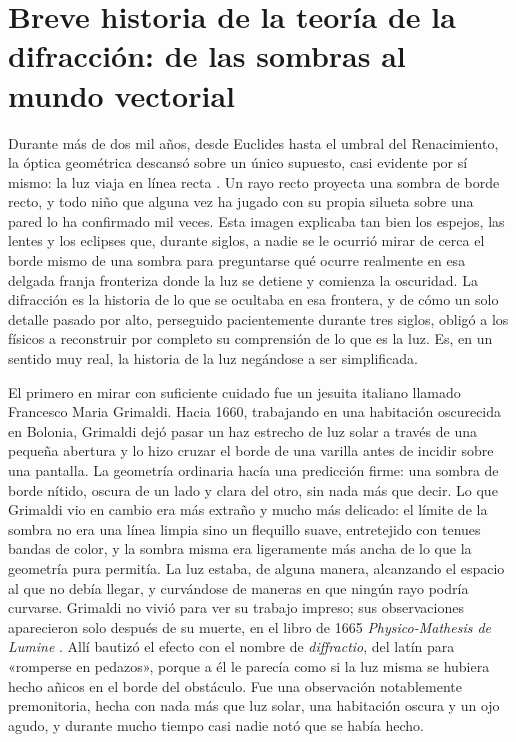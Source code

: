 \section{Breve historia de la teoría de la difracción: de las sombras al mundo vectorial}

	Durante más de dos mil años, desde Euclides hasta el umbral del Renacimiento, la óptica geométrica descansó sobre un único supuesto, casi evidente por sí mismo: la luz viaja en línea recta \cite{herzberger1966optics}. Un rayo recto proyecta una sombra de borde recto, y todo niño que alguna vez ha jugado con su propia silueta sobre una pared lo ha confirmado mil veces. Esta imagen explicaba tan bien los espejos, las lentes y los eclipses que, durante siglos, a nadie se le ocurrió mirar de cerca el borde mismo de una sombra para preguntarse qué ocurre realmente en esa delgada franja fronteriza donde la luz se detiene y comienza la oscuridad. La difracción es la historia de lo que se ocultaba en esa frontera, y de cómo un solo detalle pasado por alto, perseguido pacientemente durante tres siglos, obligó a los físicos a reconstruir por completo su comprensión de lo que es la luz. Es, en un sentido muy real, la historia de la luz negándose a ser simplificada.

	El primero en mirar con suficiente cuidado fue un jesuita italiano llamado Francesco Maria Grimaldi. Hacia 1660, trabajando en una habitación oscurecida en Bolonia, Grimaldi dejó pasar un haz estrecho de luz solar a través de una pequeña abertura y lo hizo cruzar el borde de una varilla antes de incidir sobre una pantalla. La geometría ordinaria hacía una predicción firme: una sombra de borde nítido, oscura de un lado y clara del otro, sin nada más que decir. Lo que Grimaldi vio en cambio era más extraño y mucho más delicado: el límite de la sombra no era una línea limpia sino un flequillo suave, entretejido con tenues bandas de color, y la sombra misma era ligeramente más ancha de lo que la geometría pura permitía. La luz estaba, de alguna manera, alcanzando el espacio al que no debía llegar, y curvándose de maneras en que ningún rayo podría curvarse. Grimaldi no vivió para ver su trabajo impreso; sus observaciones aparecieron solo después de su muerte, en el libro de 1665 \textit{Physico-Mathesis de Lumine} \cite{grimaldi1665physico}. Allí bautizó el efecto con el nombre de \textit{diffractio}, del latín para «romperse en pedazos», porque a él le parecía como si la luz misma se hubiera hecho añicos en el borde del obstáculo. Fue una observación notablemente premonitoria, hecha con nada más que luz solar, una habitación oscura y un ojo agudo, y durante mucho tiempo casi nadie notó que se había hecho.


